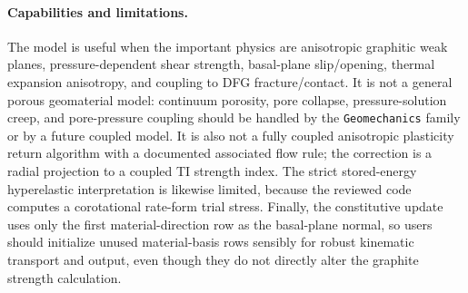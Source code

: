 \paragraph{Capabilities and limitations.}
The model is useful when the important physics are anisotropic graphitic weak planes, pressure-dependent shear strength, basal-plane slip/opening, thermal expansion anisotropy, and coupling to DFG fracture/contact.  It is not a general porous geomaterial model: continuum porosity, pore collapse, pressure-solution creep, and pore-pressure coupling should be handled by the \texttt{Geomechanics} family or by a future coupled model.  It is also not a fully coupled anisotropic plasticity return algorithm with a documented associated flow rule; the correction is a radial projection to a coupled TI strength index.  The strict stored-energy hyperelastic interpretation is likewise limited, because the reviewed code computes a corotational rate-form trial stress.  Finally, the constitutive update uses only the first material-direction row as the basal-plane normal, so users should initialize unused material-basis rows sensibly for robust kinematic transport and output, even though they do not directly alter the graphite strength calculation.

